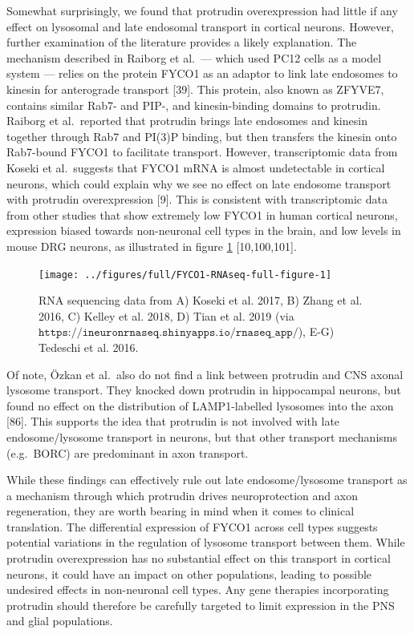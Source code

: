 \documentclass[
  12pt,
  a4paper,
]{book}
\begin{document}
Somewhat surprisingly, we found that protrudin overexpression had little if any effect on lysosomal and late endosomal transport in cortical neurons. However, further examination of the literature provides a likely explanation. The mechanism described in Raiborg et al.~--- which used PC12 cells as a model system --- relies on the protein FYCO1 as an adaptor to link late endosomes to kinesin for anterograde transport {[}39{]}. This protein, also known as ZFYVE7, contains similar Rab7- and PIP-, and kinesin-binding domains to protrudin. Raiborg et al.~reported that protrudin brings late endosomes and kinesin together through Rab7 and PI(3)P binding, but then transfers the kinesin onto Rab7-bound FYCO1 to facilitate transport. However, transcriptomic data from Koseki et al.~suggests that FYCO1 mRNA is almost undetectable in cortical neurons, which could explain why we see no effect on late endosome transport with protrudin overexpression {[}9{]}. This is consistent with transcriptomic data from other studies that show extremely low FYCO1 in human cortical neurons, expression biased towards non-neuronal cell types in the brain, and low levels in mouse DRG neurons, as illustrated in figure \ref{fig:FYCO1-RNAseq-full-figure} {[}10,100,101{]}.

\begin{figure}
\texttt{[image: ../figures/full/FYCO1-RNAseq-full-figure-1]} \caption[FYCO1 transcriptome comparisons]{RNA sequencing data from A) Koseki et al. 2017, B) Zhang et al. 2016, C) Kelley et al. 2018, D) Tian et al. 2019 (via $\texttt{https://ineuronrnaseq.shinyapps.io/rnaseq\_app/}$), E-G) Tedeschi et al. 2016.}\label{fig:FYCO1-RNAseq-full-figure}
\end{figure}

Of note, Özkan et al.~also do not find a link between protrudin and CNS axonal lysosome transport. They knocked down protrudin in hippocampal neurons, but found no effect on the distribution of LAMP1-labelled lysosomes into the axon {[}86{]}. This supports the idea that protrudin is not involved with late endosome/lysosome transport in neurons, but that other transport mechanisms (e.g.~BORC) are predominant in axon transport.

While these findings can effectively rule out late endosome/lysosome transport as a mechanism through which protrudin drives neuroprotection and axon regeneration, they are worth bearing in mind when it comes to clinical translation. The differential expression of FYCO1 across cell types suggests potential variations in the regulation of lysosome transport between them. While protrudin overexpression has no substantial effect on this transport in cortical neurons, it could have an impact on other populations, leading to possible undesired effects in non-neuronal cell types. Any gene therapies incorporating protrudin should therefore be carefully targeted to limit expression in the PNS and glial populations.
\end{document}

